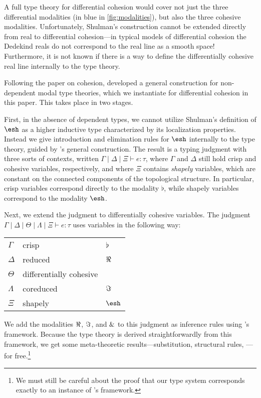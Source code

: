 \documentclass{article}
\begin{document}
A full type theory for differential cohesion would cover not just the three
differential modalities (in blue in \cref{fig:modalities}), but also the three
cohesive modalities. Unfortunately, Shulman's construction cannot be extended
directly from real to differential cohesion---in typical models of differential
cohesion the Dedekind reals do not correspond to the real line as a smooth
space! Furthermore, it is not known if there is a way to define the
differentially cohesive real line internally to the type theory.

Following the \citeyear{Licata2016} paper on cohesion, \citet{Licata2017}
developed a general construction for non-dependent modal type theories, which we
instantiate for differential cohesion in this paper. This takes place in two
stages.

First, in the absence of dependent types, we cannot utilize Shulman's definition
of $\shape$ as a higher inductive type characterized by its localization
properties. Instead we give introduction and elimination rules for $\shape$
internally to the type theory, guided by \citeauthor{Licata2017}'s general
construction. The result is a typing judgment with three sorts of contexts,
written $\Gamma \mid \Delta \mid \Xi \vdash e : \tau$, where $\Gamma$ and
$\Delta$ still hold crisp and cohesive variables, respectively, and where $\Xi$
contains \emph{shapely} variables, which are constant on the connected
components of the topological structure. In particular, crisp variables
correspond directly to the modality $\flat$, while shapely variables correspond
to the modality $\shape$.

Next, we extend the judgment to differentially cohesive variables. The judgment
$\Gamma \mid \Delta \mid \Theta \mid \Lambda \mid \Xi \vdash e : \tau$ uses
variables in the following way:
\begin{center} \begin{tabular}{lll}
    $\Gamma$ & crisp  &  $\flat$ \\
    $\Delta$ & reduced & $\Re$ \\
    $\Theta$ & differentially cohesive & \\
    $\Lambda$ & coreduced & $\Im$ \\
    $\Xi$ & shapely & $\shape$
\end{tabular} \end{center}
%
We add the modalities $\Re$, $\Im$, and $\&$ to this judgment as inference
rules using \citeauthor{Licata2017}'s framework. Because the type theory is
derived straightforwardly from this framework, we get some meta-theoretic
results---substitution, structural rules, \etc---for free.\footnote{We must
  still be careful about the proof that our type system corresponds exactly to
  an instance of \citeauthor{Licata2017}'s framework.} 
\end{document}
